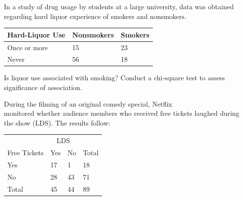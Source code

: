 \documentclass[11pt, chapterprefix=true]{scrbook}\usepackage[]{graphicx}\usepackage[]{color}
\begin{document}
\begin{exercises}
\begin{exercise} %

In a study of drug usage by students at a large university, data was obtained regarding hard liquor experience of smokers and nonsmokers.

{\small{
\begin{tabular}{@{} lll @{}} \hline
Hard-Liquor Use & Nonsmokers & Smokers \\ \hline
Once or more & 15 & 23 \\
Never        & 56 & 18 \\ \hline
\end{tabular}
}}

Is liquor use associated with smoking?  Conduct a chi-square test to assess significance of association.

\end{exercise}
\begin{solution} %

\end{solution}

\begin{exercise} %

	During the filming of an original comedy special, Netflix \\ monitored whether audience members who received free tickets laughed during the show (LDS). The results follow:

\begin{table}[ht]
\centering
\begin{tabular}{@{} llll @{}} \hline
& \multicolumn{2}{c}{LDS} \\
Free Tickets & Yes & No & Total \\ \hline
Yes & 17 & 1  & 18 \\
No  & 28 & 43 & 71  \\ \hline
Total & 45 & 44 & 89 \\ \hline
\end{tabular}
\end{table}


\end{exercise}
\end{exercises}
\end{document}
